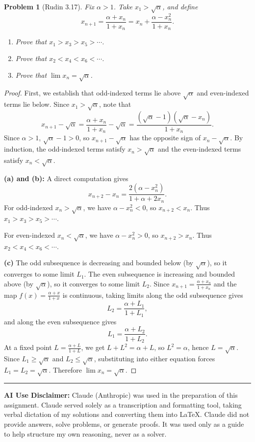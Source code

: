 \documentclass[12 pt]{article}        	%
\newtheorem{prob}{Problem}
\begin{document}
\begin{prob}[Rudin 3.17]
Fix $\alpha > 1$. Take $x_1 > \sqrt{\alpha}$, and define
\[
x_{n+1} = \frac{\alpha + x_n}{1 + x_n} = x_n + \frac{\alpha - x_n^2}{1 + x_n}.
\]
\begin{enumerate}
    \item[(a)] Prove that $x_1 > x_3 > x_5 > \cdots$.
    \item[(b)] Prove that $x_2 < x_4 < x_6 < \cdots$.
    \item[(c)] Prove that $\lim x_n = \sqrt{\alpha}$.
\end{enumerate}
\end{prob}
\begin{proof}
First, we establish that odd-indexed terms lie above $\sqrt{\alpha}$ and even-indexed terms lie below. Since $x_1 > \sqrt{\alpha}$, note that
\[
x_{n+1} - \sqrt{\alpha} = \frac{\alpha + x_n}{1 + x_n} - \sqrt{\alpha} = \frac{(\sqrt{\alpha} - 1)(\sqrt{\alpha} - x_n)}{1 + x_n}.
\]
Since $\alpha > 1$, $\sqrt{\alpha} - 1 > 0$, so $x_{n+1} - \sqrt{\alpha}$ has the opposite sign of $x_n - \sqrt{\alpha}$. By induction, the odd-indexed terms satisfy $x_n > \sqrt{\alpha}$ and the even-indexed terms satisfy $x_n < \sqrt{\alpha}$.

\textbf{(a) and (b):} A direct computation gives
\[
x_{n+2} - x_n = \frac{2(\alpha - x_n^2)}{1 + \alpha + 2x_n}.
\]
For odd-indexed $x_n > \sqrt{\alpha}$, we have $\alpha - x_n^2 < 0$, so $x_{n+2} < x_n$. Thus $x_1 > x_3 > x_5 > \cdots$.

For even-indexed $x_n < \sqrt{\alpha}$, we have $\alpha - x_n^2 > 0$, so $x_{n+2} > x_n$. Thus $x_2 < x_4 < x_6 < \cdots$.

\textbf{(c)} The odd subsequence is decreasing and bounded below (by $\sqrt{\alpha}$), so it converges to some limit $L_1$. The even subsequence is increasing and bounded above (by $\sqrt{\alpha}$), so it converges to some limit $L_2$. Since $x_{n+1} = \frac{\alpha + x_n}{1 + x_n}$ and the map $f(x) = \frac{\alpha + x}{1+x}$ is continuous, taking limits along the odd subsequence gives
\[
L_2 = \frac{\alpha + L_1}{1 + L_1},
\]
and along the even subsequence gives
\[
L_1 = \frac{\alpha + L_2}{1 + L_2}.
\]
At a fixed point $L = \frac{\alpha + L}{1 + L}$, we get $L + L^2 = \alpha + L$, so $L^2 = \alpha$, hence $L = \sqrt{\alpha}$. Since $L_1 \geq \sqrt{\alpha}$ and $L_2 \leq \sqrt{\alpha}$, substituting into either equation forces $L_1 = L_2 = \sqrt{\alpha}$. Therefore $\lim x_n = \sqrt{\alpha}$.
\end{proof}

\vspace{2em}
\hrule
\vspace{1em}
\noindent\textbf{AI Use Disclaimer:} Claude (Anthropic) was used in the preparation of this assignment. Claude served solely as a transcription and formatting tool, taking verbal dictation of my solutions and converting them into \LaTeX. Claude did not provide answers, solve problems, or generate proofs. It was used only as a guide to help structure my own reasoning, never as a solver.
\end{document}
